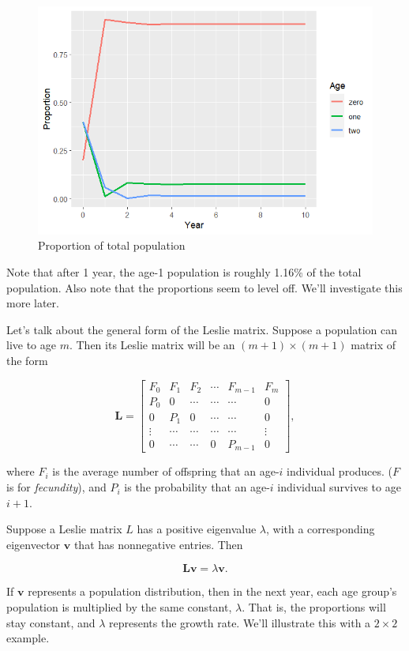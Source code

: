 \documentclass[
]{book}
\theoremstyle{definition}
\theoremstyle{definition}
\theoremstyle{definition}
\theoremstyle{definition}
\theoremstyle{remark}
\begin{document}
\begin{figure}

{\centering \includegraphics[width=0.75\linewidth]{images/leslie2} 

}

\caption{Proportion of total population}\label{fig:leslie2}
\end{figure}

Note that after 1 year, the age-1 population is roughly 1.16\% of the total population. Also note that the proportions seem to level off. We'll investigate this more later.

Let's talk about the general form of the Leslie matrix. Suppose a population can live to age \(m\). Then its Leslie matrix will be an \((m+1)\times(m+1)\) matrix of the form

\[\mathbf{L}=\begin{bmatrix} F_0 & F_1 & F_2 & \cdots  & F_{m-1} & F_m\\P_0 & 0 & \cdots & \cdots & \cdots  & 0\\ 0 & P_1 & 0 &\cdots & \cdots  & 0\\ \vdots & \cdots & \cdots & \cdots & \cdots & \vdots\\ 0 & \cdots & \cdots & 0 & P_{m-1} & 0\end{bmatrix},\]

where \(F_i\) is the average number of offspring that an age-\(i\) individual produces. (\(F\) is for \emph{fecundity}), and \(P_i\) is the probability that an age-\(i\) individual survives to age \(i+1\).

Suppose a Leslie matrix \(L\) has a positive eigenvalue \(\lambda\), with a corresponding eigenvector \(\mathbf{v}\) that has nonnegative entries. Then

\[\mathbf{L}\mathbf{v}=\lambda \mathbf{v}.\]

If \(\mathbf{v}\) represents a population distribution, then in the next year, each age group's population is multiplied by the same constant, \(\lambda\). That is, the proportions will stay constant, and \(\lambda\) represents the growth rate. We'll illustrate this with a \(2\times 2\) example.
\end{document}
